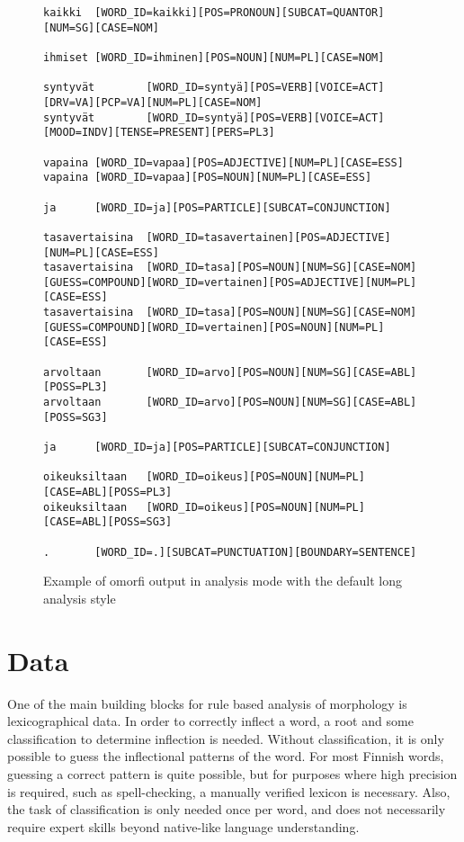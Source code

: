 \documentclass[a4paper,12pt]{article}
\begin{document}
\begin{figure}
    \begin{scriptsize}
\begin{verbatim}
kaikki  [WORD_ID=kaikki][POS=PRONOUN][SUBCAT=QUANTOR][NUM=SG][CASE=NOM]

ihmiset [WORD_ID=ihminen][POS=NOUN][NUM=PL][CASE=NOM]

syntyvät        [WORD_ID=syntyä][POS=VERB][VOICE=ACT][DRV=VA][PCP=VA][NUM=PL][CASE=NOM]
syntyvät        [WORD_ID=syntyä][POS=VERB][VOICE=ACT][MOOD=INDV][TENSE=PRESENT][PERS=PL3]

vapaina [WORD_ID=vapaa][POS=ADJECTIVE][NUM=PL][CASE=ESS]
vapaina [WORD_ID=vapaa][POS=NOUN][NUM=PL][CASE=ESS]

ja      [WORD_ID=ja][POS=PARTICLE][SUBCAT=CONJUNCTION]

tasavertaisina  [WORD_ID=tasavertainen][POS=ADJECTIVE][NUM=PL][CASE=ESS]
tasavertaisina  [WORD_ID=tasa][POS=NOUN][NUM=SG][CASE=NOM][GUESS=COMPOUND][WORD_ID=vertainen][POS=ADJECTIVE][NUM=PL][CASE=ESS]
tasavertaisina  [WORD_ID=tasa][POS=NOUN][NUM=SG][CASE=NOM][GUESS=COMPOUND][WORD_ID=vertainen][POS=NOUN][NUM=PL][CASE=ESS]

arvoltaan       [WORD_ID=arvo][POS=NOUN][NUM=SG][CASE=ABL][POSS=PL3]
arvoltaan       [WORD_ID=arvo][POS=NOUN][NUM=SG][CASE=ABL][POSS=SG3]

ja      [WORD_ID=ja][POS=PARTICLE][SUBCAT=CONJUNCTION]

oikeuksiltaan   [WORD_ID=oikeus][POS=NOUN][NUM=PL][CASE=ABL][POSS=PL3]
oikeuksiltaan   [WORD_ID=oikeus][POS=NOUN][NUM=PL][CASE=ABL][POSS=SG3]

.       [WORD_ID=.][SUBCAT=PUNCTUATION][BOUNDARY=SENTENCE]
\end{verbatim}
    \end{scriptsize}
    \caption{Example of omorfi output in analysis mode with the default
        long analysis style \label{fig:output}}
\end{figure}


\section{Data}

One of the main building blocks for rule based analysis of morphology is
lexicographical data. In order to correctly inflect a word, a root and some
classification to determine inflection is needed. Without classification, it is
only possible to guess the inflectional patterns of the word. For most Finnish
words, guessing a correct pattern is quite possible, but for purposes where
high precision is required, such as spell-checking, a manually verified lexicon
is necessary. Also, the task of classification is only needed once per word,
and does not necessarily require expert skills beyond native-like language
understanding.
\end{document}
